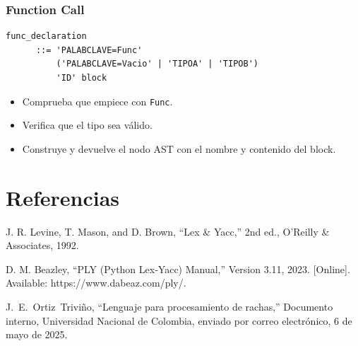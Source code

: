 \documentclass{article}
\begin{document}
\subsubsection*{Function Call}

\begin{verbatim}
func_declaration 
      ::= 'PALABCLAVE=Func' 
          ('PALABCLAVE=Vacio' | 'TIPOA' | 'TIPOB') 
          'ID' block
\end{verbatim}

\begin{itemize}
    \item Comprueba que empiece con \texttt{Func}.
    \item Verifica que el tipo sea válido.
    \item Construye y devuelve el nodo AST con el nombre y contenido del block.
\end{itemize}



\section{Referencias}
\renewcommand{\refname}{}

\begin{thebibliography}{9}


 \label{ref:lexPy1} J. R. Levine, T. Mason, and D. 
Brown, “Lex \& Yacc,” 2nd ed., O’Reilly \& Associates, 1992.

 \label{ref:lexPy2}  D. M. Beazley, “PLY (Python Lex‐Yacc)
Manual,” Version 3.11, 2023. [Online]. Available: https://www.dabeaz.com/ply/.

 \label{ref:rachas} J.~E.~Ortiz~Triviño, ``Lenguaje para 
  procesamiento de rachas,'' Documento interno, Universidad Nacional de 
    Colombia, enviado por correo electrónico, 6 de mayo de 2025.

\end{thebibliography}
\end{document}
